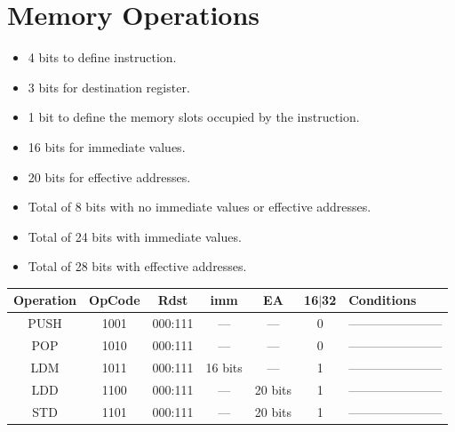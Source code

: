 \documentclass[12pt]{report}
\begin{document}
\section{Memory Operations}
\begin{itemize}
    \item 4 bits to define instruction.
    \item 3 bits for destination register.
    \item 1 bit to define the memory slots occupied by the instruction.
    \item 16 bits for immediate values.
    \item 20 bits for effective addresses.
    \item Total of 8 bits with no immediate values or effective addresses.
    \item Total of 24 bits with immediate values.
    \item Total of 28 bits with effective addresses.
\end{itemize}
\begin{center}
 \begin{tabular}{||c| c| c| c| c| c| p{40mm}||} 
 \hline
 Operation & OpCode & Rdst & imm & EA & 16$|$32 & Conditions  \\ [0.5ex] 
 \hline\hline
 PUSH & 1001 & 000:111 & --- & --- & 0 & ----------------------- \\
 \hline
 POP & 1010 & 000:111 & --- & --- & 0 & ----------------------- \\
 \hline
 LDM & 1011 & 000:111 & 16 bits & --- & 1 & ----------------------- \\
 \hline
 LDD & 1100 & 000:111 & --- & 20 bits & 1 & ----------------------- \\
 \hline
 STD & 1101 & 000:111 & --- & 20 bits & 1 & ----------------------- \\
 \hline
\end{tabular}
\end{center}
\end{document}
